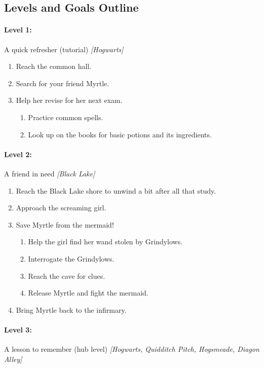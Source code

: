 \pagebreak

\subsection{Levels and Goals Outline}

\paragraph{Level 1:} A quick refresher (tutorial) \textit{[Hogwarts]}
\begin{enumerate}[1)]
	\item Reach the common hall.
	\item Search for your friend Myrtle.
	\item Help her revise for her next exam.
	\begin{enumerate}[1.]
		\item Practice common spells.
		\item Look up on the books for basic potions and its ingredients.
	\end{enumerate}
\end{enumerate}

\paragraph{Level 2:} A friend in need \textit{[Black Lake]}
\begin{enumerate}[1)]
	\item Reach the Black Lake shore to unwind a bit after all that study.
	\item Approach the screaming girl.
	\item Save Myrtle from the mermaid!
	\begin{enumerate}[1.]
		\item Help the girl find her wand stolen by Grindylows.
		\item Interrogate the Grindylows.
		\item Reach the cave for clues.
		\item Release Myrtle and fight the mermaid.
	\end{enumerate}
	\item Bring Myrtle back to the infirmary.
\end{enumerate}

\paragraph{Level 3:} A lesson to remember (hub level) \textit{[Hogwarts, Quidditch Pitch, Hogsmeade, Diagon Alley]}

